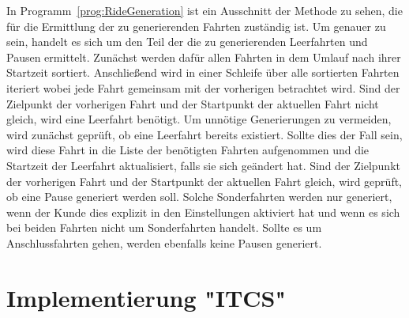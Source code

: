     In Programm~\ref{prog:RideGeneration} ist ein Ausschnitt der Methode zu sehen, die für die Ermittlung der zu generierenden Fahrten zuständig ist. Um genauer zu sein,
    handelt es sich um den Teil der die zu generierenden Leerfahrten und Pausen ermittelt. Zunächst werden dafür allen Fahrten in dem Umlauf nach ihrer Startzeit sortiert.
    Anschließend wird in einer Schleife über alle sortierten Fahrten iteriert wobei jede Fahrt gemeinsam mit der vorherigen betrachtet wird. Sind der Zielpunkt der vorherigen Fahrt
    und der Startpunkt der aktuellen Fahrt nicht gleich, wird eine Leerfahrt benötigt. Um unnötige Generierungen zu vermeiden, wird zunächst geprüft, ob eine Leerfahrt bereits existiert.
    Sollte dies der Fall sein, wird diese Fahrt in die Liste der benötigten Fahrten aufgenommen und die Startzeit der Leerfahrt aktualisiert, falls sie sich geändert hat.
    Sind der Zielpunkt der vorherigen Fahrt und der Startpunkt der aktuellen Fahrt gleich, wird geprüft, ob eine Pause generiert werden soll. Solche Sonderfahrten werden nur generiert, wenn
    der Kunde dies explizit in den Einstellungen aktiviert hat und wenn es sich bei beiden Fahrten nicht um Sonderfahrten handelt. Sollte es um Anschlussfahrten gehen,
    werden ebenfalls keine Pausen generiert.

\section{Implementierung "ITCS"}\label{sec:ImplementierungITCS}
    
